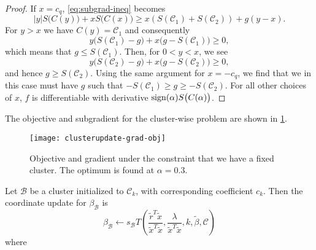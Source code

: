 \begin{proof}
  If \(x = c_q\), \eqref{eq:subgrad-ineq} becomes
  \[
    |y|S\big(C(y)\big) + x S\big(C(x)\big) \geq x(S(\mathcal{C}_1) + S(\mathcal{C}_2)) + g(y - x).
  \]
  For \(y > x\) we have \(C(y) = \mathcal{C}_1\) and consequently
  \[
    y\big(S(\mathcal{C}_1) - g\big) + x\big(g - S(\mathcal{C}_1)\big) \geq 0,
  \]
  which means that \(g \leq S(\mathcal{C}_1)\).
  Then, for \(0 < y < x\), we see
  \[
    y\big(S(\mathcal{C}_2) - g\big) + x(g - S(\mathcal{C}_2)\big) \geq 0,
  \]
  and hence \(g \geq S(\mathcal{C}_2)\).
  Using the same argument for \(x = -c_q\), we find that we in this case
  must have \(g\) such that
  \(-S(\mathcal{C}_1) \geq g \geq - S(\mathcal{C}_2)\).
  For all other choices of \(x\), \(f\) is differentiable with
  derivative \(\operatorname{sign}(\alpha)S\big(C(\alpha)\big)\).
\end{proof}

The objective and subgradient for the cluster-wise problem are shown in
\cref{fig:cluster-grad-obj}.

\begin{figure}[htbp]
  \centering
  \texttt{[image: clusterupdate-grad-obj]}
  \caption{%
    Objective and gradient under the constraint that we have a fixed
    cluster.
    The optimum is found at \(\alpha = 0.3\).
  }%
  \label{fig:cluster-grad-obj}
\end{figure}

Let \(\mathcal{B}\) be a cluster initialized to \(\mathcal{C}_k\), with
corresponding coefficient \(c_k\).
Then the coordinate update for \(\beta_\mathcal{B}\) is
\[
  \beta_\mathcal{B} \gets
  s_\mathcal{B}
  T \left(
  \frac{\tilde r^T \tilde x}{\tilde x^T \tilde x},
  \frac{\lambda}{\tilde x^T \tilde x},
  k,
  \tilde \beta,
  \mathcal{C}
  \right)
\]
where


